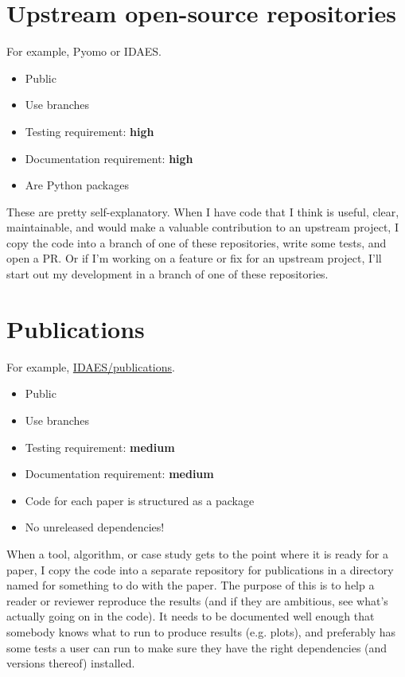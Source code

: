 \documentclass{article}
\begin{document}
\section{Upstream open-source repositories}
For example, Pyomo or IDAES.
\begin{itemize}
  \item Public
  \item Use branches
  \item Testing requirement: {\color{red}\bf high}
  \item Documentation requirement: {\color{red}\bf high}
  \item Are Python packages
\end{itemize}

These are pretty self-explanatory. When I have code that I think
is useful, clear, maintainable, and would make a valuable
contribution to an upstream project, I copy the code into a branch
of one of these repositories, write some tests, and open a PR.
Or if I'm working on a feature or fix for an upstream project,
I'll start out my development in a branch of one of these
repositories.

\section{Publications}
For example, \href{https://github.com/idaes/publications}{IDAES/publications}.
\begin{itemize}
  \item Public
  \item Use branches
  \item Testing requirement: {\color{purple}\bf medium}
  \item Documentation requirement: {\color{purple}\bf medium}
  \item Code for each paper is structured as a package
  \item No unreleased dependencies!
\end{itemize}

When a tool, algorithm, or case study gets to the point where it is
ready for a paper, I copy the code into a separate repository for
publications in a directory named for something to do with the paper.
The purpose of this is to help a reader or reviewer reproduce the
results (and if they are ambitious, see what's actually going on
in the code).
It needs to be documented well enough that somebody knows what to run
to produce results (e.g. plots), and preferably has some tests a
user can run to make sure they have the right dependencies
(and versions thereof) installed.
\end{document}
